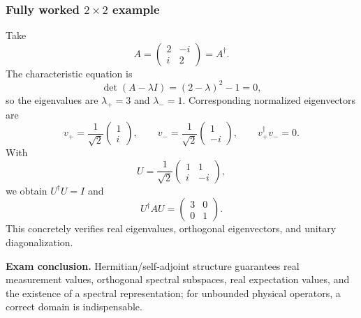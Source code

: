 \documentclass[11pt,a4paper]{article}
\begin{document}
\subsubsection{Fully worked $2\times2$ example}
Take
\begin{equation}
A=\begin{pmatrix}2&-i\\i&2\end{pmatrix}=A^\dagger.
\end{equation}
The characteristic equation is
\begin{equation}
\det(A-\lambda I)=(2-\lambda)^2-1=0,
\end{equation}
so the eigenvalues are $\lambda_+=3$ and $\lambda_-=1$. Corresponding normalized eigenvectors are
\begin{equation}
v_+=\frac1{\sqrt2}\begin{pmatrix}1\\i\end{pmatrix},\qquad
v_-=\frac1{\sqrt2}\begin{pmatrix}1\\-i\end{pmatrix},\qquad v_+^\dagger v_-=0.
\end{equation}
With
\begin{equation}
U=\frac1{\sqrt2}\begin{pmatrix}1&1\\i&-i\end{pmatrix},
\end{equation}
we obtain $U^\dagger U=I$ and
\begin{equation}
\boxed{U^\dagger AU=\begin{pmatrix}3&0\\0&1\end{pmatrix}}.
\end{equation}
This concretely verifies real eigenvalues, orthogonal eigenvectors, and unitary diagonalization.
\par\textbf{Exam conclusion.} Hermitian/self-adjoint structure guarantees real measurement values, orthogonal spectral subspaces, real expectation values, and the existence of a spectral representation; for unbounded physical operators, a correct domain is indispensable.
\end{document}
